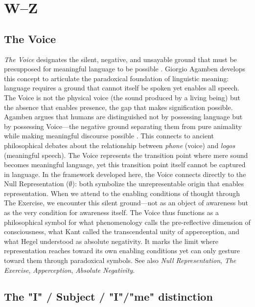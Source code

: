 \documentclass{book}
\begin{document}
\chapter{W--Z}

\section{The Voice}

\textit{The Voice} designates the silent, negative, and unsayable ground that must be presupposed for meaningful language to be possible \parencite{agamben_language_2006}. Giorgio Agamben develops this concept to articulate the paradoxical foundation of linguistic meaning: language requires a ground that cannot itself be spoken yet enables all speech. The Voice is not the physical voice (the sound produced by a living being) but the absence that enables presence, the gap that makes signification possible. Agamben argues that humans are distinguished not by possessing language but by possessing Voice---the negative ground separating them from pure animality while making meaningful discourse possible \parencite{agamben_language_2006}. This connects to ancient philosophical debates about the relationship between \textit{phone} (voice) and \textit{logos} (meaningful speech). The Voice represents the transition point where mere sound becomes meaningful language, yet this transition point itself cannot be captured in language. In the framework developed here, the Voice connects directly to the Null Representation ($\emptyset$): both symbolize the unrepresentable origin that enables representation. When we attend to the enabling conditions of thought through The Exercise, we encounter this silent ground---not as an object of awareness but as the very condition for awareness itself. The Voice thus functions as a philosophical symbol for what phenomenology calls the pre-reflective dimension of consciousness, what Kant called the transcendental unity of apperception, and what Hegel understood as absolute negativity. It marks the limit where representation reaches toward its own enabling conditions yet can only gesture toward them through paradoxical symbols. See also \textit{Null Representation}, \textit{The Exercise}, \textit{Apperception}, \textit{Absolute Negativity}.




\section{The "I" / Subject / "I"/"me" distinction}
\end{document}
